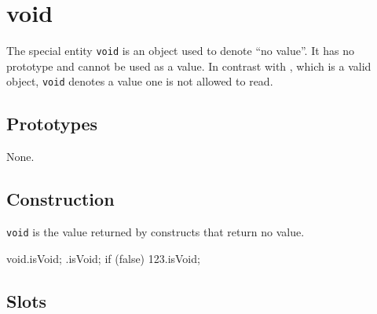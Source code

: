 
\section{void}

The special entity \lstinline|void| is an object used to denote ``no
value''.  It has no prototype and cannot be used as a value.  In contrast
with , which is a valid object, \lstinline|void| denotes a
value one is not allowed to read.

\subsection{Prototypes}

None.

\subsection{Construction}

\lstinline|void| is the value returned by constructs that return no value.

\begin{urbiassert}[firstnumber=1]
void.isVoid;
{}.isVoid;
{if (false) 123}.isVoid;
\end{urbiassert}

\subsection{Slots}

